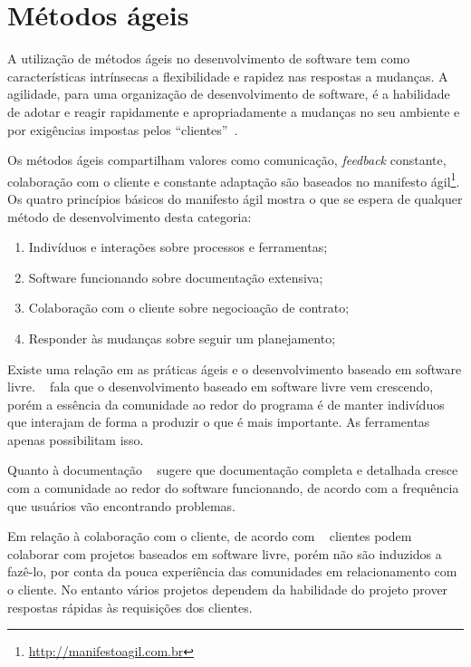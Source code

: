 
\section{Métodos ágeis}
\label{metodos-ageis}

A utilização de métodos ágeis no desenvolvimento de software tem como características 
intrínsecas a flexibilidade e rapidez nas respostas a mudanças. 
%
A agilidade, para uma organização de desenvolvimento de software, é a habilidade 
de adotar e reagir rapidamente e apropriadamente a mudanças no seu ambiente e por 
exigências impostas pelos ``clientes''~\cite{nerur2005}.
 	
Os métodos ágeis compartilham valores como comunicação, \emph{feedback} constante, colaboração com o cliente e constante adaptação são baseados no manifesto ágil\footnote{\url{http://manifestoagil.com.br}}. Os quatro princípios básicos do manifesto ágil mostra o que se espera de qualquer método de desenvolvimento desta categoria:
%
\begin{enumerate}
\item Indivíduos  e interações sobre processos e ferramentas;
\item Software funcionando sobre documentação extensiva;
\item Colaboração com o cliente sobre negocioação de contrato;
\item Responder às  mudanças sobre seguir um planejamento;
\end{enumerate}

Existe uma relação em as práticas ágeis e o desenvolvimento baseado em software livre. ~ fala que o desenvolvimento baseado em software livre vem crescendo, porém a essência da comunidade ao redor do programa é de manter indivíduos que interajam de forma a produzir o que é mais importante. As ferramentas apenas possibilitam isso. 

Quanto à documentação ~ sugere que documentação completa e detalhada cresce com a comunidade ao redor do software funcionando, de acordo com a frequência que usuários vão encontrando problemas.

Em relação à colaboração com o cliente, de acordo com ~ clientes podem colaborar com projetos baseados em software livre, porém não são induzidos a fazê-lo, por conta da pouca experiência das comunidades em relacionamento com o cliente. No entanto vários projetos dependem da habilidade do projeto prover respostas rápidas às requisições dos clientes.

